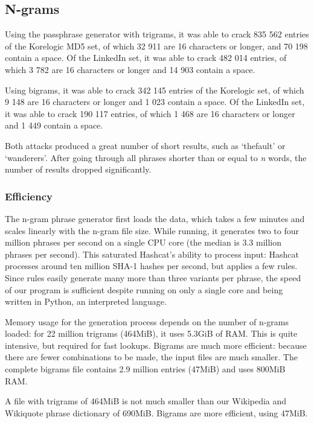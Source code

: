 \documentclass{article}
\begin{document}
\subsection{N-grams}

Using the passphrase generator with trigrams, it was able to crack 835 562
entries of the Korelogic MD5 set, of which 32 911 are 16 characters or longer,
and 70 198 contain a space. Of the LinkedIn set, it was able to crack 482 014
entries, of which 3 782 are 16 characters or longer and 14 903 contain a space.

Using bigrams, it was able to crack 342 145 entries of the Korelogic set, of
which 9 148 are 16 characters or longer and 1 023 contain a space. Of the
LinkedIn set, it was able to crack 190 117 entries, of which 1 468 are 16
characters or longer and 1 449 contain a space.

Both attacks produced a great number of short results, such as `thefault' or
`wanderers'. After going through all phrases shorter than or equal to {\it n}
words, the number of results dropped significantly.

\subsubsection{Efficiency}

The n-gram phrase generator first loads the data, which takes a few minutes and
scales linearly with the n-gram file size. While running, it generates two to
four million phrases per second on a single CPU core (the median is 3.3 million
phrases per second). This saturated Hashcat's ability to process input: Hashcat
processes around ten million SHA-1 hashes per second, but applies a few rules.
Since rules easily generate many more than three variants per phrase, the speed
of our program is sufficient despite running on only a single core and being
written in Python, an interpreted language.

Memory usage for the generation process depends on the number of n-grams
loaded: for 22 million trigrams (464MiB), it uses 5.3GiB of RAM. This is quite
intensive, but required for fast lookups. Bigrams are much more efficient:
because there are fewer combinations to be made, the input files are much
smaller. The complete bigrams file contains 2.9 million entries (47MiB) and
uses 800MiB RAM.

A file with trigrams of 464MiB is not much smaller than our Wikipedia and
Wikiquote phrase dictionary of 690MiB. Bigrams are more efficient, using 47MiB.
\end{document}
